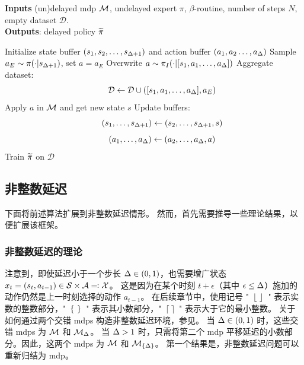 \begin{algorithm}[t]
\caption{基于 \textsc{DAgger} 的延迟模仿算法（DIDA）}\label{algo:dida}
\textbf{Inputs}
(un)delayed \gls{mdp} $\mathcal{M}$, undelayed expert $\pi$, $\beta$-routine, number of steps $N$, empty dataset $\mathcal{D}$.\\
\textbf{Outputs}: delayed policy ${\widetilde{\pi}}$
\begin{algorithmic}[1]
                \STATE Initialize state buffer $( s_{1},s_{2}, \dots, s_{\Delta+1})$ and action buffer $( a_{1},a_{2} \dots, a_{\Delta})$
            \ENDIF
            \STATE Sample $a_E\sim\pi(\cdot\vert {{s}}_{\Delta+1})$, set $a=a_E$ \label{ope:undelayed_sample}
                \STATE Overwrite ${ a \sim\pi_I(\cdot\vert [{s}_{1},a_{1}, \dots, a_{\Delta}])}$
            \ENDIF
            \STATE Aggregate dataset:
            $$\qquad \mathcal{D}\gets \mathcal{D} \cup ([{s}_{1}, a_{1}, \dots, a_{\Delta}],a_E)$$
            \STATE Apply $a$ in $\mathcal{M}$ and get new state $s$
            \STATE Update buffers:
            $$\qquad ({s}_1,\dots,{s}_{\Delta+1}) \gets ({s}_2,\dots,{s}_{\Delta+1},s)$$
            $$\qquad  ({a}_1,\dots,{a}_{\Delta}) \gets ({a}_2,\dots,{a}_{\Delta},a)$$
            \ENDFOR
        \STATE Train ${\widetilde{\pi}}$ on $\mathcal{D}$
    \ENDFOR
\end{algorithmic}
\end{algorithm}



\subsection{非整数延迟}
\label{subsec:dida_non_int}
下面将前述算法扩展到非整数延迟情形。
然而，首先需要推导一些理论结果，以便扩展该框架。


\subsubsection{非整数延迟的理论}
注意到，即使延迟小于一个步长 $\Delta\in (0,1)$，也需要增广状态 $x_t = (s_t,a_{t-1})\in \mathcal{S} \times \mathcal{A} \eqqcolon \mathcal{X}$。
这是因为在某个时刻 $t+\epsilon$（其中 $\epsilon\le\Delta$）施加的动作仍然是上一时刻选择的动作 $a_{t-1}$。
在后续章节中，使用记号 "~$\integerpart{\ }$~" 表示实数的整数部分，"~$\{\ \}$~" 表示其小数部分，"~$\lceil\ \rceil$~" 表示大于它的最小整数。
关于如何通过两个交错 \glspl{mdp} 构造非整数延迟环境，参见。
当 $\Delta\in (0,1)$ 时，这些交错 \glspl{mdp} 为 $\mathcal{M}$ 和 $\mathcal{M}_\Delta$。
当 $\Delta>1$ 时，只需将第二个 \gls{mdp} 平移延迟的小数部分。因此，这两个 \glspl{mdp} 为 $\mathcal{M}$ 和 $\mathcal{M}_{\{\Delta\}}$。
第一个结果是，非整数延迟问题可以重新归结为 \gls{mdp}。

